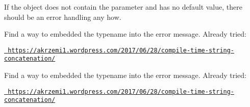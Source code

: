 
\begin{DoxyRefList}
\item[Member \mbox{\hyperlink{structts7_1_1jsonrpc_1_1_parameter_af8a4c769d2e8b650358202ff26bc38c4}{ts7\+::jsonrpc\+::Parameter$<$ U $>$\+::load}} (const boost\+::json\+::object \&o) const]\label{todo__todo000001}%
%
If the object does not contain the parameter and has no default value, there should be an error handling any how. 
\item[Class \mbox{\hyperlink{structts7_1_1jsonrpc_1_1util_1_1_from_json}{ts7\+::jsonrpc\+::util\+::From\+Json$<$ T $>$}} ]\label{todo__todo000002}%
%
Find a way to embedded the typename into the error message. Already tried\+:
\begin{DoxyItemize}
\item \href{https://akrzemi1.wordpress.com/2017/06/28/compile-time-string-concatenation/}{\texttt{ https\+://akrzemi1.\+wordpress.\+com/2017/06/28/compile-\/time-\/string-\/concatenation/}} 
\end{DoxyItemize}
\item[Class \mbox{\hyperlink{structts7_1_1jsonrpc__playground_1_1json__call_1_1_from_json}{ts7\+::jsonrpc\+\_\+playground\+::json\+\_\+call\+::From\+Json$<$ T $>$}} ]\label{todo__todo000003}%
%
Find a way to embedded the typename into the error message. Already tried\+:
\begin{DoxyItemize}
\item \href{https://akrzemi1.wordpress.com/2017/06/28/compile-time-string-concatenation/}{\texttt{ https\+://akrzemi1.\+wordpress.\+com/2017/06/28/compile-\/time-\/string-\/concatenation/}}
\end{DoxyItemize}
\end{DoxyRefList}